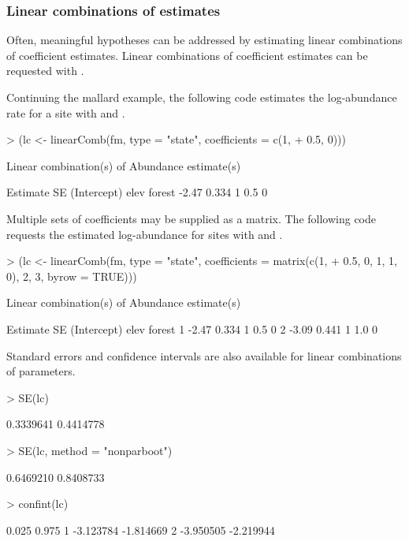\documentclass[article,shortnames]{jss}
\begin{document}
\subsubsection{Linear combinations of estimates}

Often, meaningful hypotheses can be addressed by estimating linear
combinations of coefficient estimates.  Linear combinations of coefficient
estimates can be requested with .

Continuing the mallard example, the following code estimates the
log-abundance rate for a site with  and .

\begin{Schunk}
\begin{Sinput}
> (lc <- linearComb(fm, type = "state", coefficients = c(1, 
+     0.5, 0)))
\end{Sinput}
\begin{Soutput}
Linear combination(s) of Abundance estimate(s)

 Estimate    SE (Intercept) elev forest
    -2.47 0.334           1  0.5      0
\end{Soutput}
\end{Schunk}

Multiple sets of coefficients may be supplied as a matrix.  The
following code requests the estimated log-abundance for sites with
 and .

\begin{Schunk}
\begin{Sinput}
> (lc <- linearComb(fm, type = "state", coefficients = matrix(c(1, 
+     0.5, 0, 1, 1, 0), 2, 3, byrow = TRUE)))
\end{Sinput}
\begin{Soutput}
Linear combination(s) of Abundance estimate(s)

  Estimate    SE (Intercept) elev forest
1    -2.47 0.334           1  0.5      0
2    -3.09 0.441           1  1.0      0
\end{Soutput}
\end{Schunk}

Standard errors and confidence intervals are also available for linear
combinations of parameters.

\begin{Schunk}
\begin{Sinput}
> SE(lc)
\end{Sinput}
\begin{Soutput}
[1] 0.3339641 0.4414778
\end{Soutput}
\begin{Sinput}
> SE(lc, method = "nonparboot")
\end{Sinput}
\begin{Soutput}
[1] 0.6469210 0.8408733
\end{Soutput}
\begin{Sinput}
> confint(lc)
\end{Sinput}
\begin{Soutput}
      0.025     0.975
1 -3.123784 -1.814669
2 -3.950505 -2.219944
\end{Soutput}
\end{Schunk}
\end{document}

